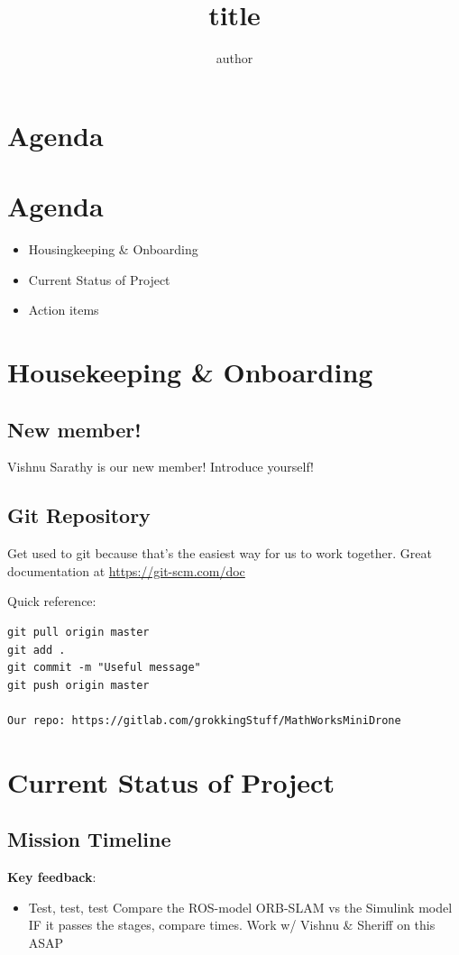 \documentclass[unrestricted]{meetingnotesminutes}
\title{ {{{title}}} }
\author{ {{{author}}} }
\date{}
\title{}
\begin{document}
\frontmatter

\section{Agenda}
\label{sec:org300fc4e}
\section*{Agenda}
\begin{itemize}
  \item Housingkeeping \& Onboarding
  \item Current Status of Project
  \item Action items
\end{itemize}

\section{Housekeeping \& Onboarding}
\label{sec:org635cd19}
\subsection{New member!}
\label{sec:org669c370}
Vishnu Sarathy is our new member! Introduce yourself!

\subsection{Git Repository}
\label{sec:org767152c}
Get used to git because that's the easiest way for us to work together.
Great documentation at \url{https://git-scm.com/doc}

Quick reference:
\begin{verbatim}
git pull origin master
git add .
git commit -m "Useful message"
git push origin master

Our repo: https://gitlab.com/grokkingStuff/MathWorksMiniDrone
\end{verbatim}

\section{Current Status of Project}
\label{sec:org0dce987}
\subsection{Mission Timeline}
\label{sec:org0b276e1}
\textbf{Key feedback}:

\begin{itemize}
\item Test, test, test
Compare the ROS-model ORB-SLAM vs the Simulink model
IF it passes the stages, compare times.
Work w/ Vishnu \& Sheriff on this ASAP
\end{itemize}
\end{document}
